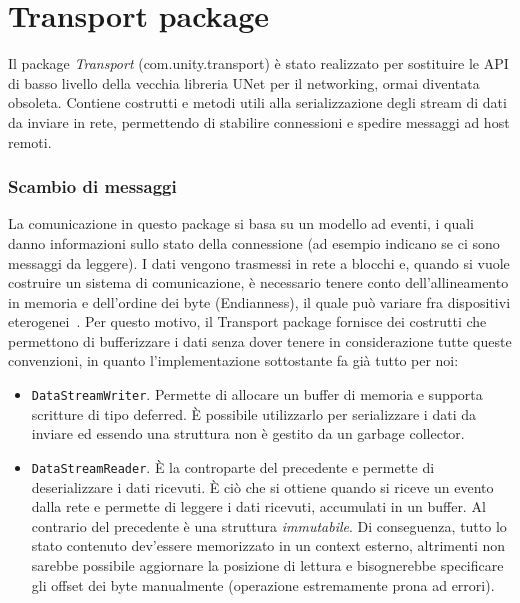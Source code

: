 \section{Transport package}
Il package \emph{Transport} (com.unity.transport) è stato realizzato per sostituire le API di basso livello della vecchia libreria UNet per il networking, ormai diventata obsoleta. Contiene costrutti e metodi utili alla serializzazione degli stream di dati da inviare in rete, permettendo di stabilire connessioni e spedire messaggi ad host remoti.

\subsubsection{Scambio di messaggi}
La comunicazione in questo package si basa su un modello ad eventi, i quali danno informazioni sullo stato della connessione (ad esempio indicano se ci sono messaggi da leggere). I dati vengono trasmessi in rete a blocchi e, quando si vuole costruire un sistema di comunicazione, è necessario tenere conto dell'allineamento in memoria e dell'ordine dei byte (Endianness), il quale può variare fra dispositivi eterogenei~\cite{doc:microsoft-memory-alignment, youtube:unity-transport}. Per questo motivo, il Transport package fornisce dei costrutti che permettono di bufferizzare i dati senza dover tenere in considerazione tutte queste convenzioni, in quanto l'implementazione sottostante fa già tutto per noi:
\begin{itemize}
    \item \verb|DataStreamWriter|. Permette di allocare un buffer di memoria e supporta scritture di tipo deferred. È possibile utilizzarlo per serializzare i dati da inviare ed essendo una struttura non è gestito da un garbage collector.
    \item \verb|DataStreamReader|. È la controparte del precedente e permette di deserializzare i dati ricevuti. È ciò che si ottiene quando si riceve un evento dalla rete e permette di leggere i dati ricevuti, accumulati in un buffer. Al contrario del precedente è una struttura \emph{immutabile}. Di conseguenza, tutto lo stato contenuto dev'essere memorizzato in un context esterno, altrimenti non sarebbe possibile aggiornare la posizione di lettura e bisognerebbe specificare gli offset dei byte manualmente (operazione estremamente prona ad errori).
\end{itemize}

